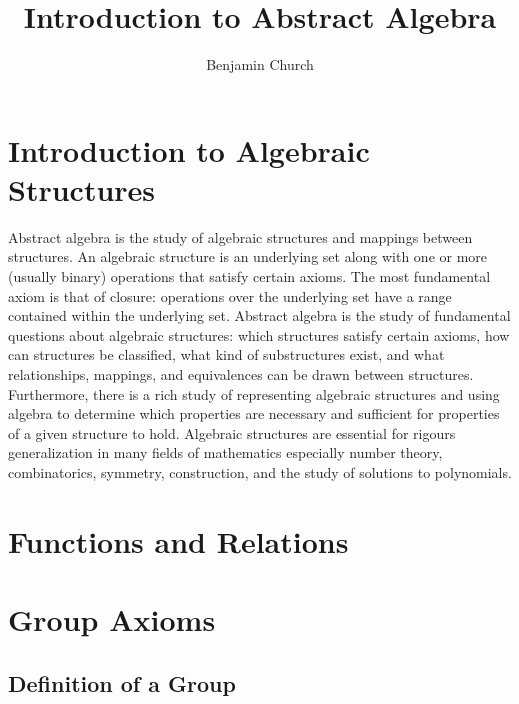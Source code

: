 \documentclass[12pt]{extarticle}
\theoremstyle{definition}
\begin{document}
\author{Benjamin Church}
\title{\Huge Introduction to Abstract Algebra}
\date{}

\maketitle
\tableofcontents
\newpage

\section{Introduction to Algebraic Structures}
Abstract algebra is the study of algebraic structures and mappings between structures. An algebraic structure is an underlying set along with one or more (usually binary) operations that satisfy certain axioms. The most fundamental axiom is that of closure: operations over the underlying set have a range contained within the underlying set. Abstract algebra is the study of fundamental questions about algebraic structures: which structures satisfy certain axioms, how can structures be classified, what kind of substructures exist, and what relationships, mappings, and equivalences can be drawn between structures. Furthermore, there is a rich study of representing algebraic structures and using algebra to determine which properties are necessary and sufficient for properties of a given structure to hold. Algebraic structures are essential for rigours generalization in many fields of mathematics especially number theory, combinatorics, symmetry, construction, and the study of solutions to polynomials.  

\section{Functions and Relations}

\section{Group Axioms}

\subsection{Definition of a Group}
\end{document}
